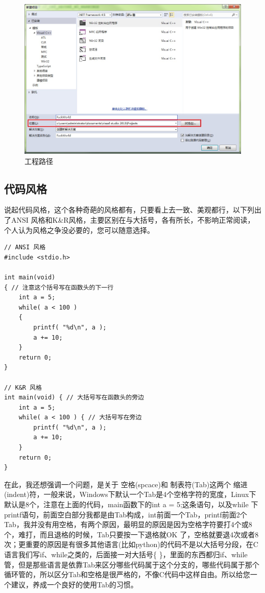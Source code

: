 \documentclass[11pt,twoside,a4paper,titlepage]{article}	%
\newcommand{\kw}[1]{\textcolor[rgb]{0.0,0.0,0.63}{ #1}}
\begin{document}
\begin{figure}[bpht]
\centering
\includegraphics[scale=.5]{../src/projectpath.jpg}
\caption{工程路径}
\label{fig:projectPath}
\end{figure}

\subsection{代码风格}
说起代码风格，这个各种奇葩的风格都有，只要看上去一致、美观都行，以下列出了ANSI 风格和K\&R风格，主要区别在与大括号，各有所长，不影响正常阅读，个人认为风格之争没必要的，您可以随意选择。

\begin{lstlisting}
// ANSI 风格
#include <stdio.h>

int main(void)
{ // 注意这个括号写在函数头的下一行
	int a = 5;
	while( a < 100 )
	{
		printf( "%d\n", a );
		a += 10;
	}
	return 0;
}

// K&R 风格
int main(void) { // 大括号写在函数头的旁边
	int a = 5;
	while( a < 100 ) { // 大括号写在旁边
		printf( "%d\n", a );
		a += 10;
	}
	return 0;
}
\end{lstlisting}

在此，我还想强调一个问题，是关于\kw{空格(spcace)}和\kw{制表符(Tab)}这两个\kw{缩进(indent)}符，一般来说，Windows下默认一个Tab是4个空格字符的宽度，Linux下默认是8个，注意在上面的代码，main函数下的int a = 5;这条语句，以及while 下printf语句，前面空白部分我都是由Tab构成，int前面一个Tab，printf前面2个Tab，我并没有用空格，有两个原因，最明显的原因是因为空格字符要打4个或8 个，难打，而且退格的时候，Tab只要按一下退格就OK 了，空格就要退4次或者8次；更重要的原因是有很多其他语言(比如python)的代码不是以大括号分段，在C语言我们写if、while之类的，后面接一对大括号\{ \}，里面的东西都归if、while管，但是那些语言是依靠Tab来区分哪些代码属于这个分支的，哪些代码属于那个循环管的，所以区分Tab和空格是很严格的，不像C代码中这样自由。所以给您一个建议，养成一个良好的使用Tab的习惯。
\end{document}
